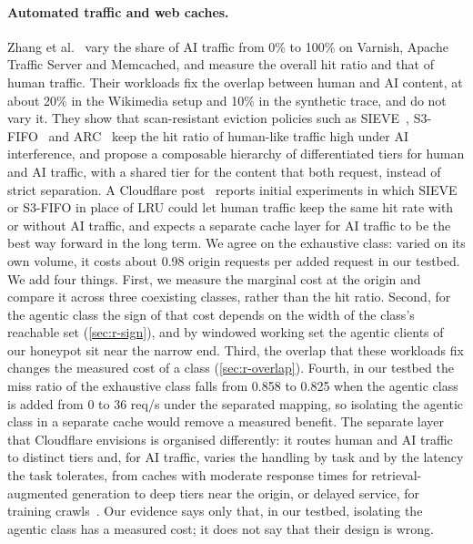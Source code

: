 \paragraph{Automated traffic and web caches.}
Zhang et al.~\cite{zhang2025} vary the share of AI traffic from 0\% to 100\% on Varnish,
Apache Traffic Server and Memcached, and measure the overall hit ratio and that of human
traffic.
Their workloads fix the overlap between human and AI content, at about 20\% in the
Wikimedia setup and 10\% in the synthetic trace, and do not vary it.
They show that scan-resistant eviction policies such as SIEVE~\cite{zhang2024sieve},
S3-FIFO~\cite{yang2023s3fifo} and ARC~\cite{megiddo2003arc} keep the
hit ratio of human-like traffic high under AI interference, and propose a composable
hierarchy of differentiated tiers for human and AI traffic, with a shared tier for the
content that both request, instead of strict separation.
A Cloudflare post~\cite{cloudflare2026cache} reports initial experiments in which SIEVE or
S3-FIFO in place of LRU could let human traffic keep the same hit rate with or without AI
traffic, and expects a separate cache layer for AI traffic to be the best way forward in the
long term.
We agree on the exhaustive class: varied on its own volume, it costs about 0.98 origin
requests per added request in our testbed.
We add four things.
First, we measure the marginal cost at the origin and compare it across three coexisting
classes, rather than the hit ratio.
Second, for the agentic class the sign of that cost depends on the width of the class's
reachable set (\cref{sec:r-sign}), and by windowed working set the agentic clients of our
honeypot sit near the narrow end.
Third, the overlap that these workloads fix changes the measured cost of a class
(\cref{sec:r-overlap}).
Fourth, in our testbed the miss ratio of the exhaustive class falls from 0.858 to 0.825
when the agentic class is added from 0 to 36 req/s under the separated mapping, so
isolating the agentic class in a
separate cache would remove a measured benefit.
The separate layer that Cloudflare envisions is organised differently: it routes human and
AI traffic to distinct tiers and, for AI traffic, varies the handling by task and by the
latency the task tolerates, from caches with moderate response times for
retrieval-augmented generation to deep tiers near the origin, or delayed service, for
training crawls~\cite{cloudflare2026cache}.
Our evidence says only that, in our testbed, isolating the agentic class has a measured
cost; it does not say that their design is wrong.

